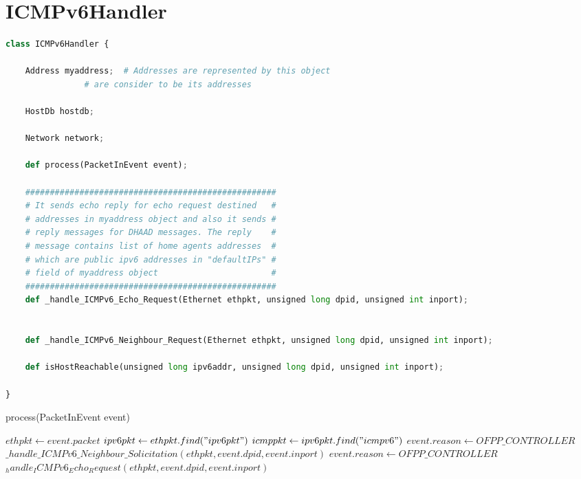 \documentclass[10pt,a4paper,titlepage]{report}
\begin{document}
		\section{ICMPv6Handler}
			\begin{lstlisting}[language=Python]
class ICMPv6Handler {

	Address myaddress;	# Addresses are represented by this object
				# are consider to be its addresses
	
	HostDb hostdb;
	
	Network network;
	
	def process(PacketInEvent event);
	
	###################################################
	# It sends echo reply for echo request destined   #
	# addresses in myaddress object and also it sends #
	# reply messages for DHAAD messages. The reply    #
	# message contains list of home agents addresses  #
	# which are public ipv6 addresses in "defaultIPs" #
	# field of myaddress object                       #
	###################################################
	def _handle_ICMPv6_Echo_Request(Ethernet ethpkt, unsigned long dpid, unsigned int inport);
	
	
	def _handle_ICMPv6_Neighbour_Request(Ethernet ethpkt, unsigned long dpid, unsigned int inport);
	
	def isHostReachable(unsigned long ipv6addr, unsigned long dpid, unsigned int inport);

}
		\end{lstlisting}
		
		\begin{algorithm}
			\caption{process(PacketInEvent event)}
			\begin{algorithmic}[1]
				\STATE $ethpkt \leftarrow event.packet$
				\STATE $ipv6pkt \leftarrow ethpkt.find("ipv6pkt")$
				\STATE $icmppkt \leftarrow ipv6pkt.find("icmpv6")$
					\STATE $event.reason \leftarrow OFPP\_CONTROLLER$
					\STATE $\_handle\_ICMPv6\_Neighbour\_Solicitation(ethpkt, event.dpid, event.inport)$
					\STATE $event.reason \leftarrow OFPP\_CONTROLLER$
					\STATE $_handle_ICMPv6_Echo_Request(ethpkt, event.dpid, event.inport)$
				\ENDIF
			\end{algorithmic}
		\end{algorithm}
		
\end{document}
